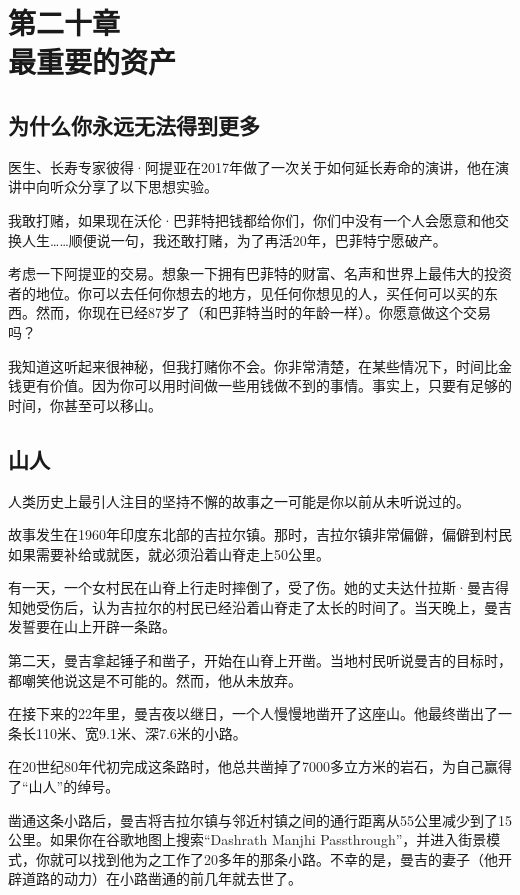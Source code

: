 \section[第二十章\q 最重要的资产]{第二十章\\ 最重要的资产}
\renewcommand{\bookchapter}{20}
\setcounter{figure}{0}
\setcounter{table}{0}

\subsection{为什么你永远无法得到更多}

医生、长寿专家彼得·阿提亚在2017年做了一次关于如何延长寿命的演讲，他在演讲中向听众分享了以下思想实验。

我敢打赌，如果现在沃伦·巴菲特把钱都给你们，你们中没有一个人会愿意和他交换人生……顺便说一句，我还敢打赌，为了再活20年，巴菲特宁愿破产。

考虑一下阿提亚的交易。想象一下拥有巴菲特的财富、名声和世界上最伟大的投资者的地位。你可以去任何你想去的地方，见任何你想见的人，买任何可以买的东西。然而，你现在已经87岁了（和巴菲特当时的年龄一样）。你愿意做这个交易吗？

我知道这听起来很神秘，但我打赌你不会。你非常清楚，在某些情况下，时间比金钱更有价值。因为你可以用时间做一些用钱做不到的事情。事实上，只要有足够的时间，你甚至可以移山。

\subsection{山人}

人类历史上最引人注目的坚持不懈的故事之一可能是你以前从未听说过的。

故事发生在1960年印度东北部的吉拉尔镇。那时，吉拉尔镇非常偏僻，偏僻到村民如果需要补给或就医，就必须沿着山脊走上50公里。

有一天，一个女村民在山脊上行走时摔倒了，受了伤。她的丈夫达什拉斯·曼吉得知她受伤后，认为吉拉尔的村民已经沿着山脊走了太长的时间了。当天晚上，曼吉发誓要在山上开辟一条路。

第二天，曼吉拿起锤子和凿子，开始在山脊上开凿。当地村民听说曼吉的目标时，都嘲笑他说这是不可能的。然而，他从未放弃。

在接下来的22年里，曼吉夜以继日，一个人慢慢地凿开了这座山。他最终凿出了一条长110米、宽9.1米、深7.6米的小路。

在20世纪80年代初完成这条路时，他总共凿掉了7000多立方米的岩石，为自己赢得了“山人”的绰号。

凿通这条小路后，曼吉将吉拉尔镇与邻近村镇之间的通行距离从55公里减少到了15公里。如果你在谷歌地图上搜索“Dashrath Manjhi Passthrough”，并进入街景模式，你就可以找到他为之工作了20多年的那条小路。不幸的是，曼吉的妻子（他开辟道路的动力）在小路凿通的前几年就去世了。

